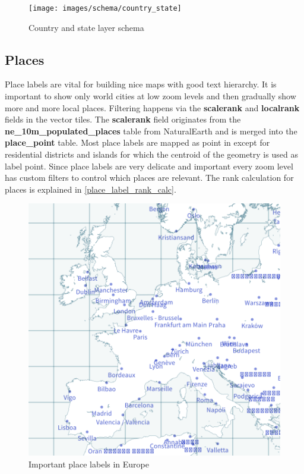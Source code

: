 \begin{figure}[H]
  \centering
  \texttt{[image: images/schema/country\_state]}
  \caption{Country and state layer schema}
\end{figure}

\subsection{Places}

\noindent\begin{minipage}[t]{0.48\linewidth}
    \vspace{0pt}
    Place labels are vital for building nice maps with good text hierarchy.
    It is important to show only world cities at low zoom levels and then gradually show more and more local places. Filtering happens via the \textbf{scalerank} and \textbf{localrank} fields in the vector tiles. The \textbf{scalerank} field originates from the \textbf{ne\_10m\_populated\_places} table from NaturalEarth and is merged into the \textbf{place\_point} table. Most place labels are mapped as point in \osm{} except for residential districts and islands for which the centroid of the geometry is used as label point.
    Since place labels are very delicate and important
    every zoom level has custom filters to control which places are relevant.
    The rank calculation for places is explained in \autoref{place_label_rank_calc}.
\end{minipage}
\hfill
\begin{minipage}[t]{0.48\linewidth}
    \begin{figure}[H]
      \includegraphics[width=1\textwidth]{images/schema/place_example}
      \caption{Important place labels in Europe}
    \end{figure}
\end{minipage}

